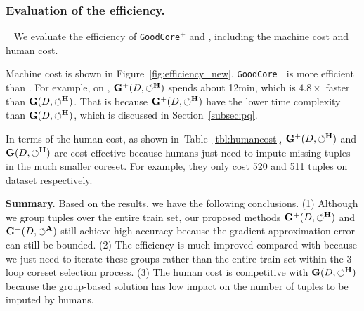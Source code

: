 \subsubsection{Evaluation of the efficiency.}~\label{sec:exp:efficiency_g} We  evaluate the efficiency of \texttt{GoodCore}$^+$ and \ours, including the machine cost and human cost.

 Machine cost is shown  in Figure~\ref{fig:efficiency_new}.  \texttt{GoodCore}$^+$ is more efficient than \ours. For example, on \imdbl, $\mathbf{G}^+(D,\circlearrowleft^\mathbf{H})$ spends about 12min, which is $4.8\times$ faster than $\mathbf{G}(D,\circlearrowleft^\mathbf{H})$. That is because $\mathbf{G}^+(D,\circlearrowleft^\mathbf{H})$ have the lower time complexity than $\mathbf{G}(D,\circlearrowleft^\mathbf{H})$, which is discussed in Section~\ref{subsec:pq}.


 In terms of the human cost, as shown in~Table~\ref{tbl:humancost}, $\mathbf{G}^+(D,\circlearrowleft^\mathbf{H})$ and $\mathbf{G}(D,\circlearrowleft^\mathbf{H})$ are cost-effective because humans just need to impute missing tuples in the much smaller coreset. For example, they only cost 520 and 511 tuples on dataset \imdbl respectively. 

\noindent \textbf{Summary.} 
Based on the results, we have the following conclusions. (1) Although we group tuples over the entire train set, our proposed methods $\mathbf{G}^+(D,\circlearrowleft^\mathbf{H})$ and $\mathbf{G}^+(D,\circlearrowleft^\mathbf{A})$ still achieve high  accuracy because the gradient approximation error can still be bounded. (2) The efficiency is much improved compared with \ours because we just need to iterate these groups rather than  the entire train set within the 3-loop coreset selection process. (3) The human cost is competitive with $\mathbf{G}(D,\circlearrowleft^\mathbf{H})$ because the group-based solution has low impact on the number of tuples to be imputed by humans.

